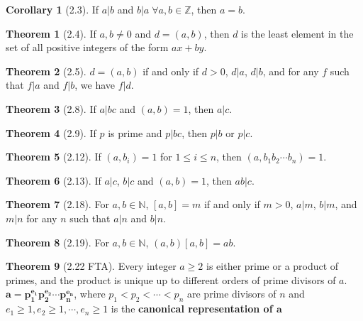 \documentclass{article}
\newcommand{\Z}{\ensuremath{\mathbb{Z}}}
\newcommand{\N}{\ensuremath{\mathbb{N}}}
\newcommand{\Iff}{if and only if}
\theoremstyle{definition}
\newtheorem*{cor}{Corollary}
\newtheorem*{thm}{Theorem}
\theoremstyle{remark}
\begin{document}
{        \begin{cor}[2.3]
            If $a|b$ and $b|a \; \forall a,b \in \Z$, then $a=b$.
        \end{cor}
        
        \begin{thm}[2.4]
            If $a,b \neq 0$ and $d=(a,b)$, then $d$ is the least element in the set of all positive integers of the form $ax+by$.
        \end{thm}
        
        \begin{thm}[2.5]
            $d=(a,b)$ \Iff{} $d>0$, $d|a$, $d|b$, and for any $f$ such that $f|a$ and $f|b$, we have $f|d$.
        \end{thm}
        
        \begin{thm}[2.8]
            If $a|bc$ and $(a,b)=1$, then $a|c$.
        \end{thm}
        
        \begin{thm}[2.9]
            If $p$ is prime and $p|bc$, then $p|b$ or $p|c$.
        \end{thm}
        
        \begin{thm}[2.12]
            If $(a, b_i)=1$ for $1\leq i \leq n$, then $(a,b_1b_2\cdots b_n)=1$.
        \end{thm}
        
        \begin{thm}[2.13]
            If $a|c$, $b|c$ and $(a,b)=1$, then $ab|c$.
        \end{thm}
        
        \begin{thm}[2.18]
            For $a,b \in \N$, $[a,b]=m$ \Iff{} $m>0$, $a|m$, $b|m$, and $m|n$ for any $n$ such that $a|n$ and $b|n$.
        \end{thm}
        
        \begin{thm}[2.19]
            For $a,b \in \N$, $(a,b)[a,b]=ab$.
        \end{thm}
        
        \begin{thm}[2.22 FTA]
            Every integer $a\geq 2$ is either prime or a product of primes, and the product is unique up to different orders of prime divisors of $a$. $\mathbf{a=p_1^{e_1}p_2^{e_2}\cdots p_n^{e_n}}$, where $p_1<p_2<\cdots<p_n$ are prime divisors of $n$ and $e_1\geq1, e_2\geq1, \cdots, e_n\geq 1$ is the \textbf{canonical representation of $\mathbf{a}$}
        \end{thm}
        
}
\end{document}
